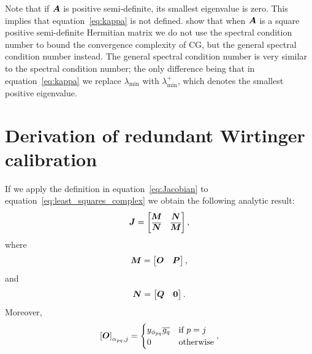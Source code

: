 \documentclass[useAMS,usenatbib]{mn2e}
\newcommand{\bA}{\bmath{A}}
\newcommand{\bJ}{\bmath{J}}
\newcommand{\bN}{\bmath{N}}
\newcommand{\bM}{\bmath{M}}
\newcommand{\bO}{\bmath{O}}
\newcommand{\bP}{\bmath{P}}
\newcommand{\bQ}{\bmath{Q}}
\newcommand{\bzero}{\bmath{0}}
\newcommand{\conj}[1]{\overline{#1}}
\begin{document}
Note that if $\bA$ is positive semi-definite, its smallest eigenvalue is zero. This implies that equation~\ref{eq:kappa} is not defined. \citet{Lu2015} show that when $\bA$
is a square positive semi-definite Hermitian matrix we do not use the spectral condition number to bound the convergence complexity of CG, but the general spectral condition
number instead. The general spectral condition number is very similar to the spectral condition number; the only difference being that in equation~\ref{eq:kappa} we replace  
$\lambda_{\textrm{min}}$ with $\lambda_{\textrm{min}}^+$, which denotes the smallest positive eigenvalue.


\section{Derivation of redundant Wirtinger calibration}
\label{sec:analytic}
If we apply the definition in equation~\ref{eq:Jacobian} to equation~\ref{eq:least_squares_complex} we obtain the following analytic result:
\begin{equation}
\label{eq:Jacobian_red}
\bJ = \begin{bmatrix}
       \bM & \bN\\
       \conj{\bN} & \conj{\bM}
      \end{bmatrix},
\end{equation}
where
\begin{equation}
\bM =\begin{bmatrix}
      \bO & \bP
     \end{bmatrix},
\end{equation}
and 
\begin{equation}
\bN = \begin{bmatrix}
       \bQ & \bzero
      \end{bmatrix}.
\end{equation}
Moreover,
\begin{equation}
\left [ \bO  \right ]_{\alpha_{pq},j} = \begin{cases}
                                         y_{\phi_{pq}}\conj{g_q} & \textrm{if}~p=j\\
                                         0  & \textrm{otherwise} 
                                        \end{cases},
\end{equation}
\end{document}
